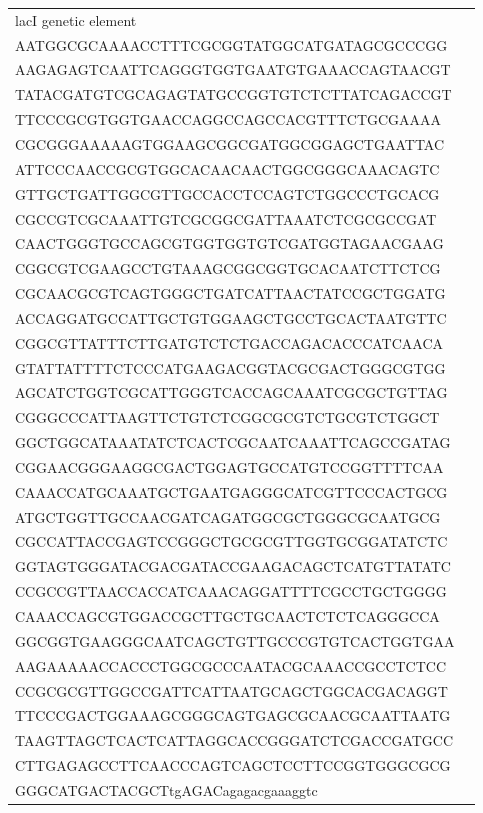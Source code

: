 \begin{landscape}
\begin{longtable}{|l|l|}
		lacI genetic element &
		\begin{tabular}[c]{@{}l@{}}cgatgtacgtctcaCTCGGGAGCGTCGAGATCCCGGACACCATCG\\ AATGGCGCAAAACCTTTCGCGGTATGGCATGATAGCGCCCGG\\ AAGAGAGTCAATTCAGGGTGGTGAATGTGAAACCAGTAACGT\\ TATACGATGTCGCAGAGTATGCCGGTGTCTCTTATCAGACCGT\\ TTCCCGCGTGGTGAACCAGGCCAGCCACGTTTCTGCGAAAA\\ CGCGGGAAAAAGTGGAAGCGGCGATGGCGGAGCTGAATTAC\\ ATTCCCAACCGCGTGGCACAACAACTGGCGGGCAAACAGTC\\ GTTGCTGATTGGCGTTGCCACCTCCAGTCTGGCCCTGCACG\\ CGCCGTCGCAAATTGTCGCGGCGATTAAATCTCGCGCCGAT\\ CAACTGGGTGCCAGCGTGGTGGTGTCGATGGTAGAACGAAG\\ CGGCGTCGAAGCCTGTAAAGCGGCGGTGCACAATCTTCTCG\\ CGCAACGCGTCAGTGGGCTGATCATTAACTATCCGCTGGATG\\ ACCAGGATGCCATTGCTGTGGAAGCTGCCTGCACTAATGTTC\\ CGGCGTTATTTCTTGATGTCTCTGACCAGACACCCATCAACA\\ GTATTATTTTCTCCCATGAAGACGGTACGCGACTGGGCGTGG\\ AGCATCTGGTCGCATTGGGTCACCAGCAAATCGCGCTGTTAG\\ CGGGCCCATTAAGTTCTGTCTCGGCGCGTCTGCGTCTGGCT\\ GGCTGGCATAAATATCTCACTCGCAATCAAATTCAGCCGATAG\\ CGGAACGGGAAGGCGACTGGAGTGCCATGTCCGGTTTTCAA\\ CAAACCATGCAAATGCTGAATGAGGGCATCGTTCCCACTGCG\\ ATGCTGGTTGCCAACGATCAGATGGCGCTGGGCGCAATGCG\\ CGCCATTACCGAGTCCGGGCTGCGCGTTGGTGCGGATATCTC\\ GGTAGTGGGATACGACGATACCGAAGACAGCTCATGTTATATC\\ CCGCCGTTAACCACCATCAAACAGGATTTTCGCCTGCTGGGG\\ CAAACCAGCGTGGACCGCTTGCTGCAACTCTCTCAGGGCCA\\ GGCGGTGAAGGGCAATCAGCTGTTGCCCGTGTCACTGGTGAA\\ AAGAAAAACCACCCTGGCGCCCAATACGCAAACCGCCTCTCC\\ CCGCGCGTTGGCCGATTCATTAATGCAGCTGGCACGACAGGT\\ TTCCCGACTGGAAAGCGGGCAGTGAGCGCAACGCAATTAATG\\ TAAGTTAGCTCACTCATTAGGCACCGGGATCTCGACCGATGCC\\ CTTGAGAGCCTTCAACCCAGTCAGCTCCTTCCGGTGGGCGCG\\ GGGCATGACTACGCTtgAGACagagacgaaaggtc\end{tabular} \\ \hline

\end{longtable}
\end{landscape}
